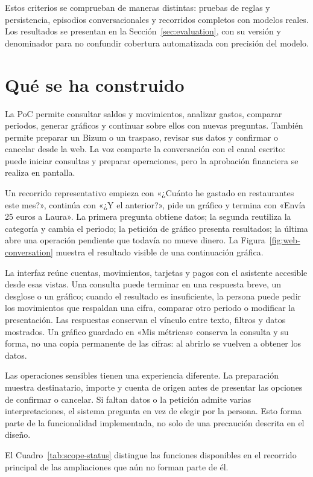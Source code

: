 \documentclass[12pt,a4paper]{article}
\begin{document}
Estos criterios se comprueban de maneras distintas: pruebas de reglas y persistencia, episodios conversacionales y recorridos completos con modelos reales. Los resultados se presentan en la Sección~\ref{sec:evaluation}, con su versión y denominador para no confundir cobertura automatizada con precisión del modelo.

\section{Qué se ha construido}
La PoC permite consultar saldos y movimientos, analizar gastos, comparar periodos, generar gráficos y continuar sobre ellos con nuevas preguntas. También permite preparar un Bizum o un traspaso, revisar sus datos y confirmar o cancelar desde la web. La voz comparte la conversación con el canal escrito: puede iniciar consultas y preparar operaciones, pero la aprobación financiera se realiza en pantalla.

Un recorrido representativo empieza con «¿Cuánto he gastado en restaurantes este mes?», continúa con «¿Y el anterior?», pide un gráfico y termina con «Envía 25 euros a Laura». La primera pregunta obtiene datos; la segunda reutiliza la categoría y cambia el periodo; la petición de gráfico presenta resultados; la última abre una operación pendiente que todavía no mueve dinero. La Figura~\ref{fig:web-conversation} muestra el resultado visible de una continuación gráfica.

La interfaz reúne cuentas, movimientos, tarjetas y pagos con el asistente accesible desde esas vistas. Una consulta puede terminar en una respuesta breve, un desglose o un gráfico; cuando el resultado es insuficiente, la persona puede pedir los movimientos que respaldan una cifra, comparar otro periodo o modificar la presentación. Las respuestas conservan el vínculo entre texto, filtros y datos mostrados. Un gráfico guardado en «Mis métricas» conserva la consulta y su forma, no una copia permanente de las cifras: al abrirlo se vuelven a obtener los datos.

Las operaciones sensibles tienen una experiencia diferente. La preparación muestra destinatario, importe y cuenta de origen antes de presentar las opciones de confirmar o cancelar. Si faltan datos o la petición admite varias interpretaciones, el sistema pregunta en vez de elegir por la persona. Esto forma parte de la funcionalidad implementada, no solo de una precaución descrita en el diseño.

El Cuadro~\ref{tab:scope-status} distingue las funciones disponibles en el recorrido principal de las ampliaciones que aún no forman parte de él.
\end{document}
